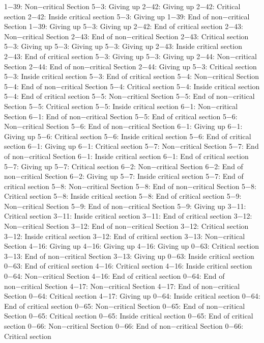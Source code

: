 1−39: Non−critical Section
5−3: Giving up
2−42: Giving up
2−42: Critical section
2−42: Inside critical section
5−3: Giving up
1−39: End of non−critical Section
1−39: Giving up
5−3: Giving up
2−42: End of critical section
2−43: Non−critical Section
2−43: End of non−critical Section
2−43: Critical section
5−3: Giving up
5−3: Giving up
5−3: Giving up
2−43: Inside critical section
2−43: End of critical section
5−3: Giving up
5−3: Giving up
2−44: Non−critical Section
2−44: End of non−critical Section
2−44: Giving up
5−3: Critical section
5−3: Inside critical section
5−3: End of critical section
5−4: Non−critical Section
5−4: End of non−critical Section
5−4: Critical section
5−4: Inside critical section
5−4: End of critical section
5−5: Non−critical Section
5−5: End of non−critical Section
5−5: Critical section
5−5: Inside critical section
6−1: Non−critical Section
6−1: End of non−critical Section
5−5: End of critical section
5−6: Non−critical Section
5−6: End of non−critical Section
6−1: Giving up
6−1: Giving up
5−6: Critical section
5−6: Inside critical section
5−6: End of critical section
6−1: Giving up
6−1: Critical section
5−7: Non−critical Section
5−7: End of non−critical Section
6−1: Inside critical section
6−1: End of critical section
5−7: Giving up
5−7: Critical section
6−2: Non−critical Section
6−2: End of non−critical Section
6−2: Giving up
5−7: Inside critical section
5−7: End of critical section
5−8: Non−critical Section
5−8: End of non−critical Section
5−8: Critical section
5−8: Inside critical section
5−8: End of critical section
5−9: Non−critical Section
5−9: End of non−critical Section
5−9: Giving up
3−11: Critical section
3−11: Inside critical section
3−11: End of critical section
3−12: Non−critical Section
3−12: End of non−critical Section
3−12: Critical section
3−12: Inside critical section
3−12: End of critical section
3−13: Non−critical Section
4−16: Giving up
4−16: Giving up
4−16: Giving up
0−63: Critical section
3−13: End of non−critical Section
3−13: Giving up
0−63: Inside critical section
0−63: End of critical section
4−16: Critical section
4−16: Inside critical section
0−64: Non−critical Section
4−16: End of critical section
0−64: End of non−critical Section
4−17: Non−critical Section
4−17: End of non−critical Section
0−64: Critical section
4−17: Giving up
0−64: Inside critical section
0−64: End of critical section
0−65: Non−critical Section
0−65: End of non−critical Section
0−65: Critical section
0−65: Inside critical section
0−65: End of critical section
0−66: Non−critical Section
0−66: End of non−critical Section
0−66: Critical section
